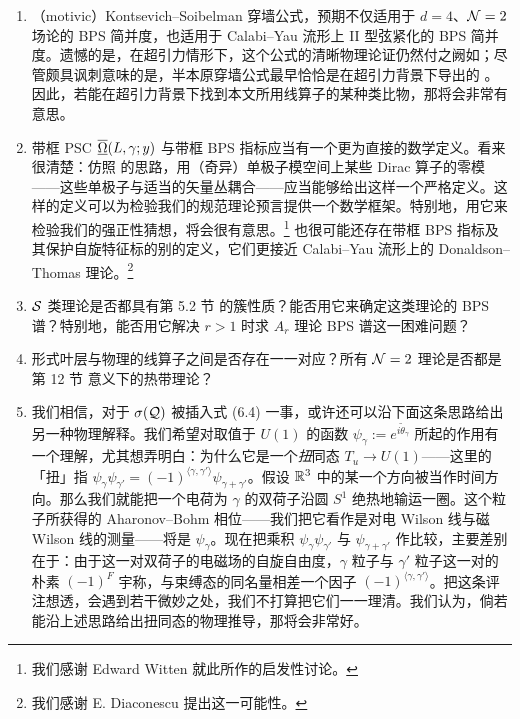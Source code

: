 \begin{enumerate}

\item （motivic）Kontsevich--Soibelman 穿墙公式，预期不仅适用于 $d=4$、$\mathcal{N}=2$ 场论的 BPS 简并度，也适用于 Calabi--Yau 流形上 II 型弦紧化的 BPS 简并度。遗憾的是，在超引力情形下，这个公式的清晰物理论证仍然付之阙如；尽管颇具讽刺意味的是，半本原穿墙公式最早恰恰是在超引力背景下导出的 \cite{Denef:2007vg}。因此，若能在超引力背景下找到本文所用线算子的某种类比物，那将会非常有意思。

\item 带框 PSC $\overline{\underline{\Omega}}(L,\gamma;y)$ 与带框 BPS 指标应当有一个更为直接的数学定义。看来很清楚：仿照 \cite{Sen:1994yi,Gauntlett:1993sh,Weinberg:2006rq,Hitchin-L2} 的思路，用（奇异）单极子模空间上某些 Dirac 算子的零模——这些单极子与适当的矢量丛耦合——应当能够给出这样一个严格定义。这样的定义可以为检验我们的规范理论预言提供一个数学框架。特别地，用它来检验我们的强正性猜想，将会很有意思。\footnote{我们感谢 Edward Witten 就此所作的启发性讨论。} 也很可能还存在带框 BPS 指标及其保护自旋特征标的别的定义，它们更接近 Calabi--Yau 流形上的 Donaldson--Thomas 理论。\footnote{我们感谢 E. Diaconescu 提出这一可能性。}

\item $\mathcal{S}$ 类理论是否都具有第 5.2 节%
的簇性质？能否用它来确定这类理论的 BPS 谱？特别地，能否用它解决 $r>1$ 时求 $A_r$ 理论 BPS 谱这一困难问题？

\item 形式叶层与物理的线算子之间是否存在一一对应？所有 $\mathcal{N}=2$ 理论是否都是第 12 节%
意义下的热带理论？

\item 我们相信，对于 $\sigma(\mathcal{Q})$ 被插入式 (6.4)%
一事，或许还可以沿下面这条思路给出另一种物理解释。我们希望对取值于 $U(1)$ 的函数 $\psi_{\gamma} := e^{i\tilde\theta_{\gamma}}$ 所起的作用有一个理解，尤其想弄明白：为什么它是一个\emph{扭}同态 $T_u \to U(1)$——这里的「扭」指
$\psi_{\gamma}\psi_{\gamma'} = (-1)^{\langle \gamma, \gamma'\rangle}\psi_{\gamma+\gamma'}$。假设 $\mathbb{R}^3$ 中的某一个方向被当作时间方向。那么我们就能把一个电荷为 $\gamma$ 的双荷子沿圆 $S^1$ 绝热地输运一圈。这个粒子所获得的 Aharonov--Bohm 相位——我们把它看作是对电 Wilson 线与磁 Wilson 线的测量——将是 $\psi_{\gamma}$。现在把乘积 $\psi_{\gamma}\psi_{\gamma'}$ 与 $\psi_{\gamma+\gamma'}$ 作比较，主要差别在于：由于这一对双荷子的电磁场的自旋自由度，$\gamma$ 粒子与 $\gamma'$ 粒子这一对的朴素 $(-1)^F$ 宇称，与束缚态的同名量相差一个因子 $(-1)^{\langle \gamma,\gamma'\rangle}$。把这条评注想透，会遇到若干微妙之处，我们不打算把它们一一理清。我们认为，倘若能沿上述思路给出扭同态的物理推导，那将会非常好。


\end{enumerate}
